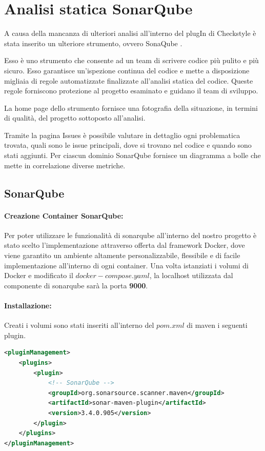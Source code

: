 \section{Analisi statica SonarQube}
A causa della mancanza di ulteriori analisi all'interno del plugIn di Checkstyle è stata inserito un ulteriore strumento, ovvero SonaQube \cite{SonarQube}.

Esso è uno strumento che consente ad un team di scrivere codice più pulito e più sicuro. Esso garantisce un'ispezione continua del codice e mette a disposizione migliaia di regole automatizzate finalizzate all’analisi statica del codice. Queste regole forniscono protezione al progetto esaminato e guidano il team di sviluppo.

La home page dello strumento fornisce una fotografia della situazione, in termini di qualità, del progetto sottoposto all’analisi.

Tramite la pagina Issues è possibile valutare in dettaglio ogni problematica trovata, quali sono le issue principali, dove si trovano nel codice e quando sono stati aggiunti.
Per ciascun dominio SonarQube fornisce un diagramma a bolle che mette in correlazione diverse metriche.


\subsection{SonarQube}
\paragraph{Creazione Container SonarQube:}
Per poter utilizzare le funzionalità di sonarqube all'interno del nostro progetto è stato scelto l'implementazione attraverso offerta dal framework Docker, dove viene garantito un ambiente altamente personalizzabile, flessibile e di facile implementazione all'interno di ogni container.
Una volta istanziati i volumi di Docker e modificato il $docker-compose.yaml$, la localhost utilizzata dal componente di sonarqube sarà la porta \textbf{9000}.

\paragraph{Installazione:}
Creati i volumi sono stati inseriti all'interno del $pom.xml$ di maven i seguenti plugin.

\begin{lstlisting}[language=XML, caption={Implementazioni pom.xml}]
<pluginManagement>
    <plugins>
        <plugin>
            <!-- SonarQube -->
            <groupId>org.sonarsource.scanner.maven</groupId>
            <artifactId>sonar-maven-plugin</artifactId>
            <version>3.4.0.905</version>
        </plugin>
    </plugins>
</pluginManagement>
\end{lstlisting}

